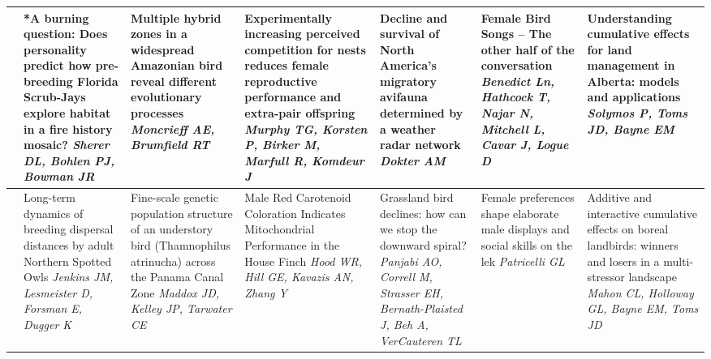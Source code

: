 \begin{tabular}{|x{0.75cm}|x{2.25cm}|x{2.25cm}|x{2.25cm}|a{2.25cm}|a{2.25cm}|a{2.25cm}|}
&*A burning question: Does personality predict how pre-breeding Florida Scrub-Jays explore habitat in a fire history mosaic? \newline \newline \textit{Sherer DL, Bohlen PJ, Bowman JR} & Multiple hybrid zones in a widespread Amazonian bird reveal different evolutionary processes \newline \newline \textit{Moncrieff AE, Brumfield RT} & Experimentally increasing perceived competition for nests reduces female reproductive performance and extra-pair offspring \newline \newline \textit{Murphy TG, Korsten P, Birker M, Marfull R, Komdeur J} & Decline and survival of North America's migratory avifauna determined by a weather radar network \newline \newline \textit{Dokter AM} & Female Bird Songs – The other half of the conversation \newline \newline \textit{Benedict Ln, Hathcock T, Najar N, Mitchell L, Cavar J, Logue D} & Understanding cumulative effects for land management in Alberta: models and applications \newline \newline \textit{Solymos P, Toms JD, Bayne EM}\\
\hline
{}&Long-term dynamics of breeding dispersal distances by adult Northern Spotted Owls \newline \newline \textit{Jenkins JM, Lesmeister D, Forsman E, Dugger K} & Fine-scale genetic population structure of an understory bird (Thamnophilus atrinucha) across the Panama Canal Zone \newline \newline \textit{Maddox JD, Kelley JP, Tarwater CE} & Male Red Carotenoid Coloration Indicates Mitochondrial Performance in the House Finch \newline \newline \textit{Hood WR, Hill GE, Kavazis AN, Zhang Y} & Grassland bird declines: how can we stop the downward spiral? \newline \newline \textit{Panjabi AO, Correll M, Strasser EH, Bernath-Plaisted J, Beh A, VerCauteren TL} & Female preferences shape elaborate male displays and social skills on the lek \newline \newline \textit{Patricelli GL} & Additive and interactive cumulative effects on boreal landbirds: winners and losers in a multi-stressor landscape \newline \newline \textit{Mahon CL, Holloway GL, Bayne EM, Toms JD}\\

\end{tabular}
